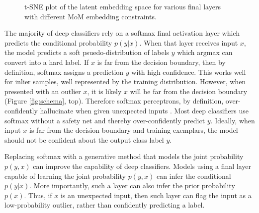\documentclass[10pt,twocolumn,letterpaper]{article}
\begin{document}
\begin{figure}[ht]
\begin{subfigure}[t]{.24\textwidth}
		\subcaption{}
	\end{subfigure}
	\caption{t-SNE\cite{tsne} plot of the latent embedding space for various final layers with different MoM embedding constraints.} 
	\label{fig:cifar10tsne}
\end{figure}

The majority of deep classifiers rely on a softmax final activation layer which predicts the conditional probability $p(y|x)$.
When that layer receives input $x$, the model predicts a soft psuedo-distribution of labels $y$ which argmax can convert into a hard label.
If $x$ is far from the decision boundary, then by definition, softmax assigns a prediction $y$ with high confidence.
This works well for inlier samples, well represented by the training distribution.
However, when presented with an outlier $x$, it is likely $x$ will be far from the decision boundary (Figure \ref{fig:schema}, top).
Therefore softmax perceptrons, by definition, over-confidently hallucinate when given unexpected inputs \cite{wei2022mitigating}. 
Most deep classifiers use softmax without a safety net and thereby over-confidently predict $y$.
Ideally, when input $x$ is far from the decision boundary and training exemplars, the model should not be confident about the output class label $y$.

Replacing softmax with a generative method that models the joint probability $p(y,x)$ can improve the capability of deep classifiers. 
Models using a final layer capable of learning the joint probability $p(y,x)$ can infer the conditional $p(y|x)$.
More importantly, such a layer can also infer the prior probability $p(x)$.
Thus, if $x$ is an unexpected input, then such layer can flag the input as a low-probability outlier, rather than confidently predicting a label.
\end{document}

